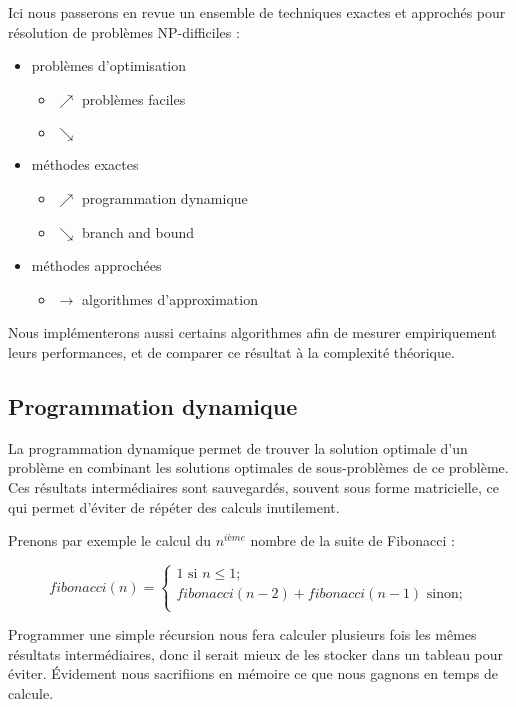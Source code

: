 Ici nous passerons en revue un ensemble de techniques exactes et approchés pour 
résolution de problèmes NP-difficiles :

\begin{itemize}
  \item problèmes d'optimisation 
  \begin{itemize}
    \item[] $\nearrow$ problèmes faciles
    \item[] $\searrow$ 
  \end{itemize}
	\item méthodes exactes 
	\begin{itemize}
		\item[] $\nearrow$ programmation dynamique
		\item[] $\searrow$ branch and bound
	\end{itemize}
	\item méthodes approchées
	\begin{itemize}
		\item[] $\longrightarrow$ algorithmes d'approximation
	\end{itemize}
\end{itemize}

Nous implémenterons aussi certains algorithmes afin de mesurer empiriquement leurs performances, et de comparer ce résultat à la complexité théorique.

\subsection{Programmation dynamique}
La programmation dynamique permet de trouver la solution optimale d'un
problème en combinant les solutions optimales de sous-problèmes de ce
problème. Ces résultats intermédiaires sont sauvegardés, souvent sous
forme matricielle, ce qui permet d'éviter de répéter des calculs inutilement.

Prenons par exemple le calcul du $n^{ième}$ nombre de la suite de Fibonacci :

\begin{equation}
fibonacci(n) = 
\begin{cases}
1 \text{ si } n \leq 1; \\
fibonacci(n-2) + fibonacci(n-1) \text{ sinon};\\
\end{cases}
\end{equation}

Programmer une simple récursion nous fera calculer plusieurs fois les mêmes résultats intermédiaires, donc il serait mieux de les stocker dans un tableau pour éviter. Évidement  nous sacrifiions en mémoire ce que nous gagnons en temps de calcule.


